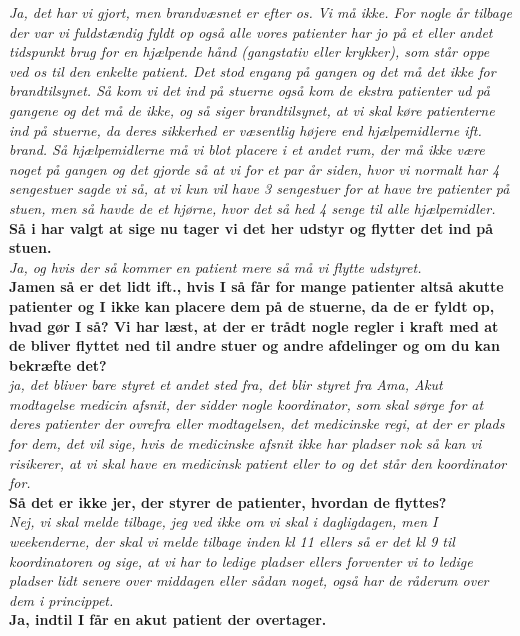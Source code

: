 \textit{Ja, det har vi gjort, men brandvæsnet er efter os. Vi må ikke. For nogle år tilbage der var vi fuldstændig fyldt op også alle vores patienter har jo på et eller andet tidspunkt brug for en hjælpende hånd (gangstativ eller krykker), som står oppe ved os til den enkelte patient. Det stod engang på gangen og det må det ikke for brandtilsynet. Så kom vi det ind på stuerne også kom de ekstra patienter ud på gangene og det må de ikke, og så siger brandtilsynet, at vi skal køre patienterne ind på stuerne, da deres sikkerhed er væsentlig højere end hjælpemidlerne ift. brand. Så hjælpemidlerne må vi blot placere i et andet rum, der må ikke være noget på gangen og det gjorde så at vi for et par år siden, hvor vi normalt har 4 sengestuer sagde vi så, at vi kun vil have 3 sengestuer for at have tre patienter på stuen, men så havde de et hjørne, hvor det så hed 4 senge til alle hjælpemidler.}\\
\noindent
\textbf{Så i har valgt at sige nu tager vi det her udstyr og flytter det ind på stuen.}\\
\noindent
\textit{Ja, og hvis der så kommer en patient mere så må vi flytte udstyret.}\\
\noindent
\textbf{Jamen så er det lidt ift., hvis I så får for mange patienter altså akutte patienter og I ikke kan placere dem på de stuerne, da de er fyldt op, hvad gør I så? Vi har læst, at der er trådt nogle regler i kraft med at de bliver flyttet ned til andre stuer og andre afdelinger og om du kan bekræfte det?}\\
\noindent
\textit{ja, det bliver bare styret et andet sted fra, det blir styret fra Ama, Akut modtagelse medicin afsnit, der sidder nogle koordinator, som skal sørge for at deres patienter der ovrefra eller modtagelsen, det medicinske regi, at der er plads for dem, det vil sige, hvis de medicinske afsnit ikke har pladser nok så kan vi risikerer, at vi skal have en medicinsk patient eller to og det står den koordinator for.} \\
\noindent
\textbf{Så det er ikke jer, der styrer de patienter, hvordan de flyttes?}\\
\noindent
\textit{Nej, vi skal melde tilbage, jeg ved ikke om vi skal i dagligdagen, men I weekenderne, der skal vi melde tilbage inden kl 11 ellers så er det kl 9 til koordinatoren og sige, at vi har to ledige pladser ellers forventer vi to ledige pladser lidt senere over middagen eller sådan noget, også har de råderum over dem i princippet.}\\
\noindent
\textbf{Ja, indtil I får en akut patient der overtager.}\\

